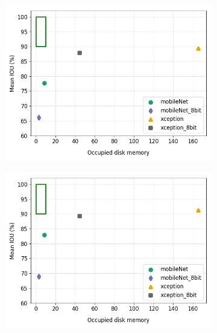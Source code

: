 	\begin{figure}
		\begin{subfigure}{.5\textwidth}
			\centering
			\includegraphics[width=1\linewidth]{images/q_mem_v_full}
		\end{subfigure}
		\begin{subfigure}{.5\textwidth}
			\centering
			\includegraphics[width=1\linewidth]{images/q_mem_v_size}
		\end{subfigure}
		\begin{subfigure}{.5\textwidth}
			\centering

\end{subfigure}
\end{figure}
